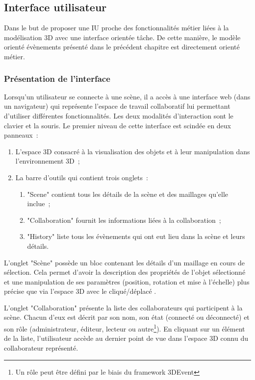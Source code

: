 \subsection{Interface utilisateur}
Dans le but de proposer une \gls{IU} proche des fonctionnalités métier liées à la 
modélisation 3D avec une interface orientée tâche. De cette manière, le modèle 
orienté évènements présenté dans le précédent chapitre est directement orienté 
métier.
\subsubsection{Présentation de l'interface}

Lorsqu'un utilisateur se connecte à une scène, il a accès à une interface web 
(dans un navigateur) qui représente l'espace de travail collaboratif lui permettant 
d'utiliser différentes fonctionnalités. Les deux modalités d'interaction sont le clavier 
et la souris. Le premier niveau de cette 
interface est scindée en deux panneaux~: 
\begin{enumerate}
	\item L'espace 3D consacré à la visualisation des objets et à leur manipulation 
	dans l'environnement 3D~;
	\item La barre d'outils qui contient trois onglets~:~
	\begin{enumerate}
		\item "Scene" contient tous les détails de la scène et des maillages qu'elle 
		inclue~; 
		\item "Collaboration" fournit les informations liées à la collaboration~;
		\item "History" liste tous les évènements qui ont eut lieu dans la scène et 
		leurs  détails. 
	\end{enumerate}
\end{enumerate}

L'onglet "Scène" possède un bloc contenant les détails d'un maillage en cours de 
sélection. Cela permet d'avoir la description des propriétés de l'objet sélectionné et 
une manipulation de ses paramètres (position, rotation et mise à l'échelle) plus 
précise que via l'espace 3D avec le cliqué/déplacé .

L'onglet "Collaboration" présente la liste des collaborateurs qui participent à la 
scène. Chacun d'eux est décrit par son nom, son état  (connecté ou déconnecté) 
et son rôle (administrateur, éditeur, lecteur ou autre\footnote{Un rôle peut être 
	défini par le biais du \gls{framework} 3DEvent}). En cliquant sur un élément de 
	la 
liste, l'utilisateur accède au dernier point de vue dans l'espace 3D connu du 
collaborateur représenté.

